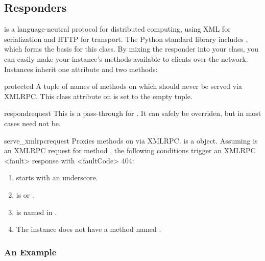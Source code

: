 \subsection{ Responders \label{xmlrpc}}

 is a language-neutral protocol for
distributed computing, using XML for serialization and HTTP for transport. The
Python standard library includes , which forms the
basis for this class. By mixing the  responder into your class,
you can easily make your instance's methods available to clients over the
network. Instances inherit one attribute and two methods:

\begin{memberdesc}[tuple]{protected} A tuple of names of methods on 
which should never be served via XMLRPC. This class attribute on 
is set to the empty tuple.\end{memberdesc}

\begin{methoddesc}{respond}{request}
This is a pass-through for . It can safely be overriden, but
in most cases need not be.
\end{methoddesc}

\begin{methoddesc}{serve_xmlrpc}{request}
Proxies methods on  via XMLRPC.  is a 
object. Assuming  is an XMLRPC request for method , the
following conditions trigger an XMLRPC <fault> response with <faultCode> 404:

\begin{enumerate}

\item {} starts with an underscore.

\item {} is  or .

\item {} is named in .

\item The instance does not have a method named .

\end{enumerate}
\end{methoddesc}


\subsubsection{An Example}

